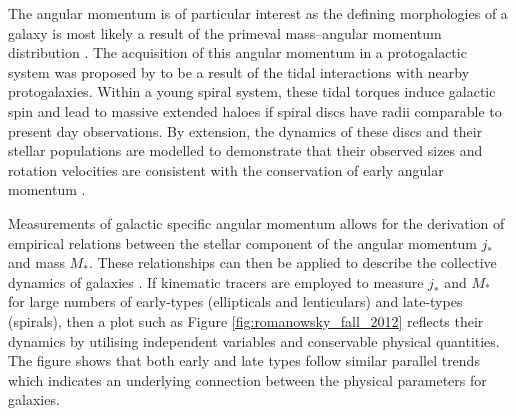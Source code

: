 \documentclass[12pt, twocolumn, nofootinbib]{revtex4-1}    %
\begin{document}
The angular momentum is of particular interest as the defining morphologies of a galaxy is most likely a result of the primeval mass--angular momentum distribution \citep{1970ApJ...160..831S}. The acquisition of this angular momentum in a protogalactic system was proposed by \cite{1969ApJ...155..393P} to be a result of the tidal interactions with nearby protogalaxies. Within a young spiral system, these tidal torques induce galactic spin and lead to massive extended haloes if spiral discs have radii comparable to present day observations. By extension, the dynamics of these discs and their stellar populations are modelled to demonstrate that their observed sizes and rotation velocities are consistent with the conservation of early angular momentum \citep{1998MNRAS.295..319M, 1997ApJ...482..659D}. 

Measurements of galactic specific angular momentum allows for the derivation of empirical relations between the stellar component of the angular momentum $j_*$ and mass $M_*$. These relationships can then be applied to describe the collective dynamics of galaxies \citep{fall1983}. If kinematic tracers are employed to measure $j_*$ and $M_*$ for large numbers of early-types (ellipticals and lenticulars) and late-types (spirals), then a plot such as Figure \ref{fig:romanowsky_fall_2012} reflects their dynamics by utilising independent variables and conservable physical quantities. The figure shows that both early and late types follow similar parallel trends which indicates an underlying connection between the physical parameters for galaxies. 
\end{document}
